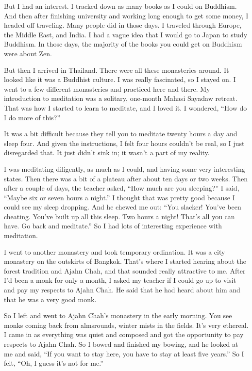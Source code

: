 But I had an interest. I tracked down as many books as I could on
Buddhism. And then after finishing university and working long enough to
get some money, I headed off traveling. Many people did in those days. I
traveled through Europe, the Middle East, and India. I had a vague idea
that I would go to Japan to study Buddhism. In those days, the majority
of the books you could get on Buddhism were about Zen.

But then I arrived in Thailand. There were all these monasteries around.
It looked like it was a Buddhist culture. I was really fascinated, so I
stayed on. I went to a few different monasteries and practiced here and
there. My introduction to meditation was a solitary, one-month Mahasi
Sayadaw retreat. That was how I started to learn to meditate, and I
loved it. I wondered, “How do I do more of this?”

It was a bit difficult because they tell you to meditate twenty hours a
day and sleep four. And given the instructions, I felt four hours
couldn’t be real, so I just disregarded that. It just didn’t sink in; it
wasn’t a part of my reality.

I was meditating diligently, as much as I could, and having some very
interesting states. Then there was a bit of a plateau after about ten
days or two weeks. Then after a couple of days, the teacher asked, “How
much are you sleeping?” I said, “Maybe six or seven hours a night.” I
thought that was pretty good because I could see my sleep dropping. And
he chewed me out: “You slacker! You’ve been cheating. You’ve built up
all this sleep. Two hours a night! That’s all you can have. Go back and
meditate.” So I had lots of interesting experience with meditation.

I went to another monastery and took temporary ordination. It was a city
monastery on the outskirts of Bangkok. That’s where I started hearing
about the forest tradition and Ajahn Chah, and that sounded really
attractive to me. After I’d been a monk for only a month, I asked my
teacher if I could go up to visit and pay my respects to Ajahn Chah. He
said that he had heard about him and that he was a very good monk.

So I left and went to Ajahn Chah’s monastery in the early morning. You
see monks coming back from almsrounds, winter mists in the fields. It’s
very ethereal. I came in as everything was quiet and composed and got
the opportunity to pay respects to Ajahn Chah. So I bowed and finished
my bowing, and he looked at me and said, “If you want to stay here, you
have to stay at least five years.” So I felt, “Oh, I guess it’s not for
me.”

